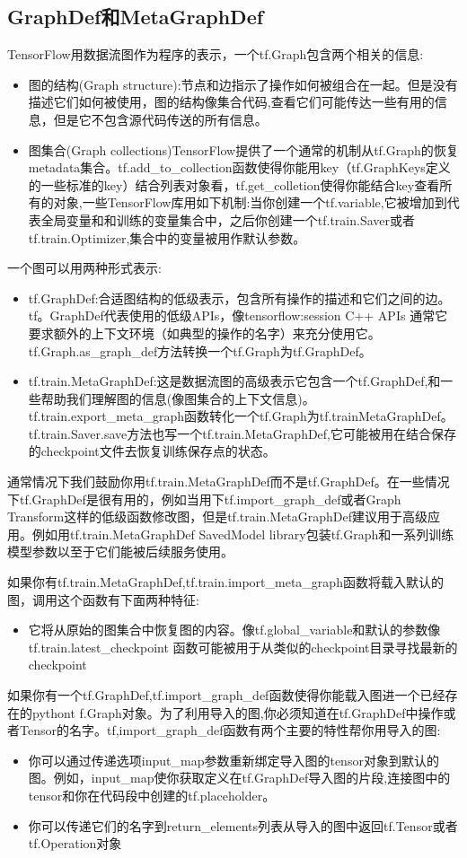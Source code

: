 \subsection{GraphDef和MetaGraphDef}
TensorFlow用数据流图作为程序的表示，一个tf.Graph包含两个相关的信息:
\begin{itemize}
\item 图的结构(Graph structure):节点和边指示了操作如何被组合在一起。但是没有描述它们如何被使用，图的结构像集合代码,查看它们可能传达一些有用的信息，但是它不包含源代码传送的所有信息。
\item 图集合(Graph collections)TensorFlow提供了一个通常的机制从tf.Graph的恢复metadata集合。tf.add\_to\_collection函数使得你能用key（tf.GraphKeys定义的一些标准的key）结合列表对象看，tf.get\_colletion使得你能结合key查看所有的对象,一些TensorFlow库用如下机制:当你创建一个tf.variable,它被增加到代表全局变量和和训练的变量集合中，之后你创建一个tf.train.Saver或者tf.train.Optimizer,集合中的变量被用作默认参数。
\end{itemize}
一个图可以用两种形式表示:
\begin{itemize}
	\item tf.GraphDef:合适图结构的低级表示，包含所有操作的描述和它们之间的边。tf。GraphDef代表使用的低级APIs，像tensorflow:session C++ APIs 通常它要求额外的上下文环境（如典型的操作的名字）来充分使用它。tf.Graph.as\_graph\_def方法转换一个tf.Graph为tf.GraphDef。
	\item tf.train.MetaGraphDef:这是数据流图的高级表示它包含一个tf.GraphDef,和一些帮助我们理解图的信息(像图集合的上下文信息)。tf.train.export\_meta\_graph函数转化一个tf.Graph为tf.trainMetaGraphDef。tf.train.Saver.save方法也写一个\newline tf.train.MetaGraphDef,它可能被用在结合保存的checkpoint文件去恢复训练保存点的状态。
\end{itemize}
通常情况下我们鼓励你用tf.train.MetaGraphDef而不是tf.GraphDef。在一些情况下tf.GraphDef是很有用的，例如当用下tf.import\_graph\_def或者Graph Transform这样的低级函数修改图，但是tf.train.MetaGraphDef建议用于高级应用。例如用tf.train.MetaGraphDef SavedModel library包装tf.Graph和一系列训练模型参数以至于它们能被后续服务使用。

如果你有tf.train.MetaGraphDef,tf.train.import\_meta\_graph函数将载入默认的图，调用这个函数有下面两种特征:
\begin{itemize}
	\item 它将从原始的图集合中恢复图的内容。像tf.global\_variable和默认的参数像 \newline tf.train.latest\_checkpoint 函数可能被用于从类似的checkpoint目录寻找最新的checkpoint
\end{itemize}
如果你有一个tf.GraphDef,tf.import\_graph\_def函数使得你能载入图进一个已经存在的pythont f.Graph对象。为了利用导入的图,你必须知道在tf.GraphDef中操作或者Tensor的名字。tf,import\_graph\_def函数有两个主要的特性帮你用导入的图:
\begin{itemize}
	\item 你可以通过传递选项input\_map参数重新绑定导入图的tensor对象到默认的图。例如，input\_map使你获取定义在tf.GraphDef导入图的片段,连接图中的tensor和你在代码段中创建的tf.placeholder。
	\item 你可以传递它们的名字到return\_elements列表从导入的图中返回tf.Tensor或者tf.Operation对象
\end{itemize}
